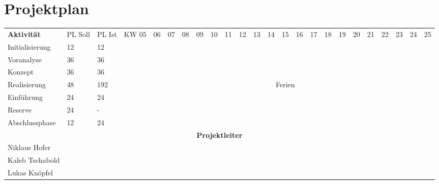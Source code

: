 \documentclass[10pt,paper=a4,final]{scrartcl}
\begin{document}
\section{Projektplan}
\newpage
\begin{landscape}
\begin{tabularx}{\textwidth}{ |p{4.0cm}|l|l|l|l|l|l|l|l|l|l|l|l|l|l|l|l|l|l|l|l|l|l|l| }
\cline{1-24}	%
\bf Aktivit\"at & PL Soll & PL Ist & KW 05 & 06 & 07 & 08 & 09 & 10 & 11 & 12 & 13 & 14 & 15 & 16 & 17 & 18 & 19 & 20 & 21 & 22 & 23 & 24 & 25 \\
\cline{1-24}
Initialisierung & 12 & 12 & & \cellcolor[gray]{0.7} & & & & & & & & & & & & & & & & & & & \\
\cline{1-24}
Voranalyse & 36 & 36 & & & \cellcolor[gray]{0.7} & \cellcolor[gray]{0.7} & \cellcolor[gray]{0.7} & & & & & & & & & & & & & & & & \\
\cline{1-24}
Konzept & 36 & 36 & & & & & & \cellcolor[gray]{0.7} & \cellcolor[gray]{0.7} & \cellcolor[gray]{0.7} & & & & & & & & & & & & & \\
\cline{1-24}
Realisierung & 48 & 192 \cellcolor{red!100!} & & & & & & & & & \cellcolor[gray]{0.7} & \multicolumn{3}{|c|}{Ferien \cellcolor{green!70!}} & \cellcolor[gray]{0.7} & \cellcolor[gray]{0.7} & \cellcolor[gray]{0.7} & & & & & & \\
\cline{1-24}
Einf\"uhrung & 24 & 24 & & & & & & & & & & & & & & & & \cellcolor[gray]{0.7} & \cellcolor[gray]{0.7} & & & & \\
\cline{1-24}
Reserve & 24 & - & & & & & & & & & & & & & & & & & & \cellcolor[gray]{0.7} & \cellcolor[gray]{0.7} & & \\
\cline{1-24}
Abschlussphase & 12 & 24 \cellcolor{red!100!} & & & & & & & & & & & & & & & & & & & & \cellcolor[gray]{0.7} & \cellcolor[gray]{0.7}\\
\cline{1-24}
\multicolumn{24}{|c|}{\bf Projektleiter} \\
\cline{1-24}
Niklaus Hofer & & & \cellcolor[gray]{0.7} & \cellcolor[gray]{0.7} & \cellcolor[gray]{0.7} & \cellcolor[gray]{0.7} & \cellcolor[gray]{0.7} & & & & & & & & & & & & & & & & \\
\cline{1-24}
Kaleb Tschabold & & & & & & & & \cellcolor[gray]{0.7} & \cellcolor[gray]{0.7} & \cellcolor[gray]{0.7} & \cellcolor[gray]{0.7} & \cellcolor[gray]{0.7} & \cellcolor[gray]{0.7} & \cellcolor[gray]{0.7} & \cellcolor[gray]{0.7} & & & & & & & & \\
\cline{1-24}
Lukas Kn\"opfel & & & & & & & & & & & & & & & & \cellcolor[gray]{0.7} & \cellcolor[gray]{0.7} & \cellcolor[gray]{0.7} & \cellcolor[gray]{0.7} & \cellcolor[gray]{0.7} & \cellcolor[gray]{0.7} & \cellcolor[gray]{0.7} & \cellcolor[gray]{0.7}\\
\cline{1-24}
\end{tabularx}
\end{landscape}
\newpage
\end{document}

